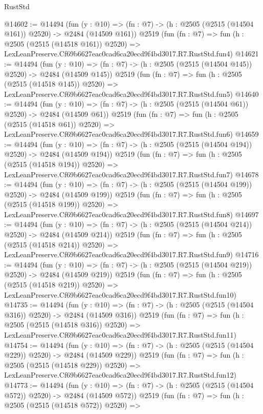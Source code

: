 \begin{lexlean}{RustStd}
\begin{coremodule}
@14602 := @14494
    (fun (y : @10) => (fn : @7) -> (h : @2505 (@2515 (@14504 @161)) @2520) -> @2484 (@14509 @161))
    @2519
    (fun (fn : @7) =>
    fun (h : @2505 (@2515 (@14518 @161)) @2520) =>
    LexLeanPreserve.Cf69b6627eac0cad6ca20ecd9f4bd3017.R7.RustStd.fun4)
@14621 := @14494
    (fun (y : @10) => (fn : @7) -> (h : @2505 (@2515 (@14504 @145)) @2520) -> @2484 (@14509 @145))
    @2519
    (fun (fn : @7) =>
    fun (h : @2505 (@2515 (@14518 @145)) @2520) =>
    LexLeanPreserve.Cf69b6627eac0cad6ca20ecd9f4bd3017.R7.RustStd.fun5)
@14640 := @14494
    (fun (y : @10) => (fn : @7) -> (h : @2505 (@2515 (@14504 @61)) @2520) -> @2484 (@14509 @61))
    @2519
    (fun (fn : @7) =>
    fun (h : @2505 (@2515 (@14518 @61)) @2520) =>
    LexLeanPreserve.Cf69b6627eac0cad6ca20ecd9f4bd3017.R7.RustStd.fun6)
@14659 := @14494
    (fun (y : @10) => (fn : @7) -> (h : @2505 (@2515 (@14504 @194)) @2520) -> @2484 (@14509 @194))
    @2519
    (fun (fn : @7) =>
    fun (h : @2505 (@2515 (@14518 @194)) @2520) =>
    LexLeanPreserve.Cf69b6627eac0cad6ca20ecd9f4bd3017.R7.RustStd.fun7)
@14678 := @14494
    (fun (y : @10) => (fn : @7) -> (h : @2505 (@2515 (@14504 @199)) @2520) -> @2484 (@14509 @199))
    @2519
    (fun (fn : @7) =>
    fun (h : @2505 (@2515 (@14518 @199)) @2520) =>
    LexLeanPreserve.Cf69b6627eac0cad6ca20ecd9f4bd3017.R7.RustStd.fun8)
@14697 := @14494
    (fun (y : @10) => (fn : @7) -> (h : @2505 (@2515 (@14504 @214)) @2520) -> @2484 (@14509 @214))
    @2519
    (fun (fn : @7) =>
    fun (h : @2505 (@2515 (@14518 @214)) @2520) =>
    LexLeanPreserve.Cf69b6627eac0cad6ca20ecd9f4bd3017.R7.RustStd.fun9)
@14716 := @14494
    (fun (y : @10) => (fn : @7) -> (h : @2505 (@2515 (@14504 @219)) @2520) -> @2484 (@14509 @219))
    @2519
    (fun (fn : @7) =>
    fun (h : @2505 (@2515 (@14518 @219)) @2520) =>
    LexLeanPreserve.Cf69b6627eac0cad6ca20ecd9f4bd3017.R7.RustStd.fun10)
@14735 := @14494
    (fun (y : @10) => (fn : @7) -> (h : @2505 (@2515 (@14504 @316)) @2520) -> @2484 (@14509 @316))
    @2519
    (fun (fn : @7) =>
    fun (h : @2505 (@2515 (@14518 @316)) @2520) =>
    LexLeanPreserve.Cf69b6627eac0cad6ca20ecd9f4bd3017.R7.RustStd.fun11)
@14754 := @14494
    (fun (y : @10) => (fn : @7) -> (h : @2505 (@2515 (@14504 @229)) @2520) -> @2484 (@14509 @229))
    @2519
    (fun (fn : @7) =>
    fun (h : @2505 (@2515 (@14518 @229)) @2520) =>
    LexLeanPreserve.Cf69b6627eac0cad6ca20ecd9f4bd3017.R7.RustStd.fun12)
@14773 := @14494
    (fun (y : @10) => (fn : @7) -> (h : @2505 (@2515 (@14504 @572)) @2520) -> @2484 (@14509 @572))
    @2519
    (fun (fn : @7) =>
    fun (h : @2505 (@2515 (@14518 @572)) @2520) =>

\end{coremodule}
\end{lexlean}

